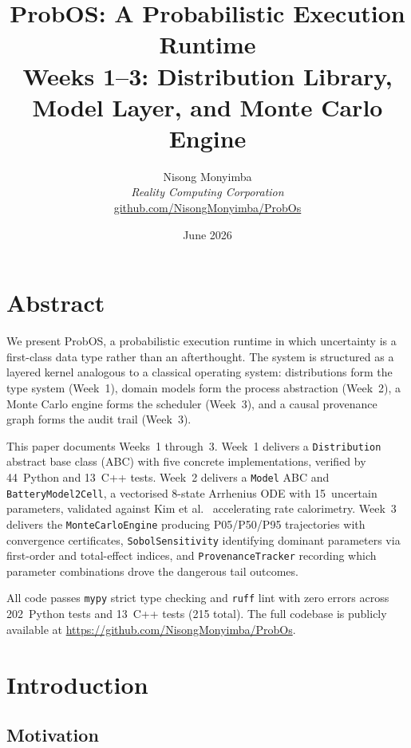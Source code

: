 \documentclass[12pt,a4paper]{article}
\title{
  \textbf{ProbOS: A Probabilistic Execution Runtime}\\[0.5em]
  \large Weeks 1--3: Distribution Library, Model Layer,
  and Monte Carlo Engine
}
\author{
  Nisong Monyimba\\
  \textit{Reality Computing Corporation}\\
  \href{https://github.com/NisongMonyimba/ProbOs}{github.com/NisongMonyimba/ProbOs}
}
\date{June 2026}
\theoremstyle{plain}
\theoremstyle{definition}
\theoremstyle{remark}
\begin{document}
\maketitle
\tableofcontents
\newpage

\section{Abstract}

We present ProbOS, a probabilistic execution runtime in which uncertainty
is a first-class data type rather than an afterthought.
The system is structured as a layered kernel analogous to a classical
operating system: distributions form the type system (Week~1),
domain models form the process abstraction (Week~2),
a Monte Carlo engine forms the scheduler (Week~3),
and a causal provenance graph forms the audit trail (Week~3).

This paper documents Weeks~1 through~3.
Week~1 delivers a \texttt{Distribution} abstract base class (ABC) with
five concrete implementations, verified by 44~Python and 13~C++ tests.
Week~2 delivers a \texttt{Model} ABC and \texttt{BatteryModel2Cell},
a vectorised 8-state Arrhenius ODE with 15~uncertain parameters,
validated against Kim et al.~\cite{kim2007} accelerating rate calorimetry.
Week~3 delivers the \texttt{MonteCarloEngine} producing P05/P50/P95
trajectories with convergence certificates, \texttt{SobolSensitivity}
identifying dominant parameters via first-order and total-effect indices,
and \texttt{ProvenanceTracker} recording which parameter combinations
drove the dangerous tail outcomes.

All code passes \texttt{mypy} strict type checking and \texttt{ruff} lint
with zero errors across 202~Python tests and 13~C++ tests (215 total).
The full codebase is publicly available at
\url{https://github.com/NisongMonyimba/ProbOs}.

\section{Introduction}

\subsection{Motivation}
\end{document}

